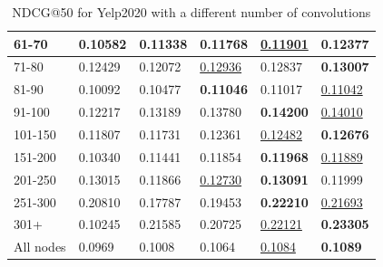 \begin{table}[]
\begin{tabular}{|l|l|l|l|l|l|}
        61-70     & 0.10582                    & 0.11338                    & 0.11768                    & \underline{0.11901}        & \textbf{0.12377}           \\ \hline
        71-80     & 0.12429                    & 0.12072                    & \underline{0.12936}        & 0.12837                    & \textbf{0.13007}           \\ \hline
        81-90     & 0.10092                    & 0.10477                    & \textbf{0.11046}           & 0.11017                    & \underline{0.11042}        \\ \hline
        91-100    & 0.12217                    & 0.13189                    & 0.13780                    & \textbf{0.14200}           & \underline{0.14010}        \\ \hline
        101-150   & 0.11807                    & 0.11731                    & 0.12361                    & \underline{0.12482}        & \textbf{0.12676}           \\ \hline
        151-200   & 0.10340                    & 0.11441                    & 0.11854                    & \textbf{0.11968}           & \underline{0.11889}        \\ \hline
        201-250   & 0.13015                    & 0.11866                    & \underline{0.12730}        & \textbf{0.13091}           & 0.11999                    \\ \hline
        251-300   & 0.20810                    & 0.17787                    & 0.19453                    & \textbf{0.22210}           & \underline{0.21693}        \\ \hline
        301+      & 0.10245                    & 0.21585                    & 0.20725                    & \underline{0.22121}        & \textbf{0.23305}           \\ \hline
        All nodes & 0.0969                     & 0.1008                     & 0.1064                     & \underline{0.1084}         & \textbf{0.1089}            \\ \hline
    \end{tabular}
    \caption{NDCG@50 for Yelp2020 with a different number of convolutions}
    \label{tab:yelp2020-con-evaluation}
\end{table}

